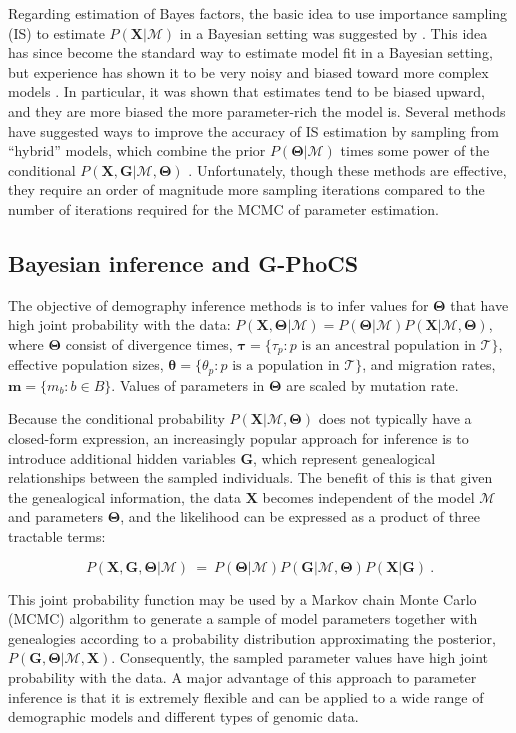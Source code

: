 \documentclass[11pt]{article}
\newcommand{\vect}[1]{\boldsymbol{\mathbf{#1}}}
\newcommand{\X}{\vect{X}}
\newcommand{\M}{\mathcal{M}}
\newcommand{\Tr}{\mathcal{T}}
\newcommand{\G}{\vect{G}}
\newcommand{\T}{\vect{\Theta}}
\newcommand{\1}{\mathbbm{1}}
\newcommand{\gp}{G-PhoCS }
\newcommand{\taus}{\vect\tau}
\newcommand{\thetas}{\vect\theta}
\newcommand{\migs}{\vect{m}}
\begin{document}
Regarding estimation of Bayes factors, the basic idea to use importance sampling (IS) to estimate $P(\X|\M)$ in a Bayesian setting was suggested by \cite{NEWTRAFT94}. 
%
This idea has since become the standard way to estimate model fit in a Bayesian setting, but experience has shown it to be very noisy and biased toward more complex models \citep{XIEETAL11}.
%
In particular, it was shown that estimates tend to be biased upward, and they are more biased the more parameter-rich the model is. 
%
Several methods have suggested ways to improve the accuracy of IS estimation by sampling from ``hybrid'' models, which combine the prior $P(\T|\M)$ times some power of the conditional $P(\X,\G|\M,\T)$ \citep{LARTPHIL06,XIEETAL11}.
%
Unfortunately, though these methods are effective, they require an order of magnitude more sampling iterations compared to the number of iterations required for the MCMC of parameter estimation.



\subsection{Bayesian inference and \gp} \label{Bayesian inference and \gp}

The objective of demography inference methods is to infer values for $\T$ that have high joint probability with the data:
$P(\X,\T|\M)=P(\T|\M)P(\X|\M,\T)$,
%
where $\T$ consist of divergence times, $\taus=\{\tau_p:p \text{ is an ancestral population in } \Tr\}$,
effective population sizes, $\thetas=\{\theta_p: p \text{ is a population in } \Tr\}$, and migration rates, $\migs=\{m_b:b \in B\}$.
%
Values of parameters in $\T$ are scaled by mutation rate.

Because the conditional probability $P(\X|\M,\T)$ does not typically have a closed-form expression, an increasingly popular approach for inference is to introduce additional hidden variables $\G$, which represent genealogical relationships
between the sampled individuals.
%
The benefit of this is that given the genealogical information, the data $\X$ becomes independent of the model $\M$ and parameters $\T$,
and the likelihood can be expressed as a product of three tractable terms:

%
\begin{equation}\label{eq:likelihood}
 P(\X,\G,\T|\M) ~=~ P(\T|\M) P(\G|\M,\T) P(\X|\G)~.
\end{equation}
%
%

This joint probability function may be used by a Markov chain Monte Carlo (MCMC) algorithm to generate a sample of model parameters
together with genealogies according to a probability distribution approximating the posterior, $P(\G,\T|\M,\X)$.
%
Consequently, the sampled parameter values have high joint probability with the data.
%
A major advantage of this approach to parameter inference is that it is extremely flexible and can be applied to a wide range of demographic models and different types of genomic data.
\end{document}
